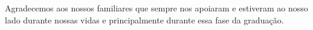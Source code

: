 Agradecemos aos nossos familiares que sempre nos apoiaram e estiveram ao nosso lado durante nossas vidas e principalmente durante essa fase da graduação.
